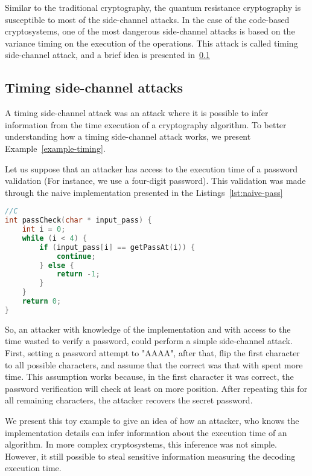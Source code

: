 Similar to the traditional cryptography, the quantum resistance cryptography is susceptible to most of the side-channel attacks. In the case of the code-based cryptosystems, one of the most dangerous side-channel attacks is based on the variance timing on the execution of the operations. This attack is called timing side-channel attack, and a brief idea is presented in~\ref{sub:timing-attack}

\subsection{Timing side-channel attacks}\label{sub:timing-attack}
A timing side-channel attack was an attack where it is possible to infer information from the time execution of a cryptography algorithm. To better understanding how a timing side-channel attack works, we present Example~\ref{example-timing}. 

\begin{example}\label{example-timing}
Let us suppose that an attacker has access to the execution time of a password validation (For instance, we use a four-digit password). This validation was made through the naive implementation presented in the Listings~\ref{lst:naive-pass}

\begin{lstlisting}[caption={Naive implementation of password check },label={lst:naive-pass},language=C]
//C
int passCheck(char * input_pass) {
    int i = 0;
    while (i < 4) {
        if (input_pass[i] == getPassAt(i)) {
            continue;
        } else {
            return -1;
        }
    }
    return 0;
}
\end{lstlisting}
So, an attacker with knowledge of the implementation and with access to the time wasted to verify a password, could perform a simple side-channel attack. First, setting a password attempt to "AAAA", after that, flip the first character to all possible characters, and assume that the correct was that with spent more time. This assumption works because, in the first character it was correct, the password verification will check at least on more position. After repeating this for all remaining characters, the attacker recovers the secret password.
\end{example}

We present this toy example to give an idea of how an attacker, who knows the implementation details can infer information about the execution time of an algorithm. In more complex cryptosystems, this inference was not simple. However, it still possible to steal sensitive information measuring the decoding execution time.

